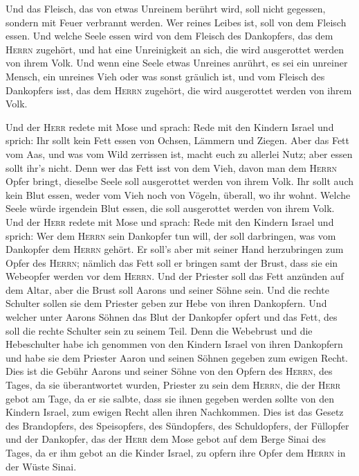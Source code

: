  Und das Fleisch, das von etwas Unreinem berührt wird,
soll nicht gegessen, sondern mit Feuer verbrannt werden. Wer reines
Leibes ist, soll von dem Fleisch essen.  Und welche Seele
essen wird von dem Fleisch des Dankopfers, das dem \textsc{Herrn}
zugehört, und hat eine Unreinigkeit an sich, die wird ausgerottet werden
von ihrem Volk.  Und wenn eine Seele etwas Unreines
anrührt, es sei ein unreiner Mensch, ein unreines Vieh oder was sonst
gräulich ist, und vom Fleisch des Dankopfers isst, das dem
\textsc{Herrn} zugehört, die wird ausgerottet werden von ihrem Volk.

 Und der \textsc{Herr} redete mit Mose und sprach:
 Rede mit den Kindern Israel und sprich: Ihr sollt kein
Fett essen von Ochsen, Lämmern und Ziegen.  Aber das Fett
vom Aas, und was vom Wild zerrissen ist, macht euch zu allerlei Nutz;
aber essen sollt ihr's nicht.  Denn wer das Fett isst von
dem Vieh, davon man dem \textsc{Herrn} Opfer bringt, dieselbe Seele soll
ausgerottet werden von ihrem Volk.  Ihr sollt auch kein
Blut essen, weder vom Vieh noch von Vögeln, überall, wo ihr wohnt.
 Welche Seele würde irgendein Blut essen, die soll
ausgerottet werden von ihrem Volk.  Und der \textsc{Herr}
redete mit Mose und sprach:  Rede mit den Kindern Israel
und sprich: Wer dem \textsc{Herrn} sein Dankopfer tun will, der soll
darbringen, was vom Dankopfer dem \textsc{Herrn} gehört. 
Er soll's aber mit seiner Hand herzubringen zum Opfer des
\textsc{Herrn}; nämlich das Fett soll er bringen samt der Brust, dass
sie ein Webeopfer werden vor dem \textsc{Herrn}.  Und der
Priester soll das Fett anzünden auf dem Altar, aber die Brust soll
Aarons und seiner Söhne sein.  Und die rechte Schulter
sollen sie dem Priester geben zur Hebe von ihren Dankopfern.
 Und welcher unter Aarons Söhnen das Blut der Dankopfer
opfert und das Fett, des soll die rechte Schulter sein zu seinem Teil.
 Denn die Webebrust und die Hebeschulter habe ich
genommen von den Kindern Israel von ihren Dankopfern und habe sie dem
Priester Aaron und seinen Söhnen gegeben zum ewigen Recht.
 Dies ist die Gebühr Aarons und seiner Söhne von den
Opfern des \textsc{Herrn}, des Tages, da sie überantwortet wurden,
Priester zu sein dem \textsc{Herrn},  die der
\textsc{Herr} gebot am Tage, da er sie salbte, dass sie ihnen gegeben
werden sollte von den Kindern Israel, zum ewigen Recht allen ihren
Nachkommen.  Dies ist das Gesetz des Brandopfers, des
Speisopfers, des Sündopfers, des Schuldopfers, der Füllopfer und der
Dankopfer,  das der \textsc{Herr} dem Mose gebot auf dem
Berge Sinai des Tages, da er ihm gebot an die Kinder Israel, zu opfern
ihre Opfer dem \textsc{Herrn} in der Wüste Sinai.

